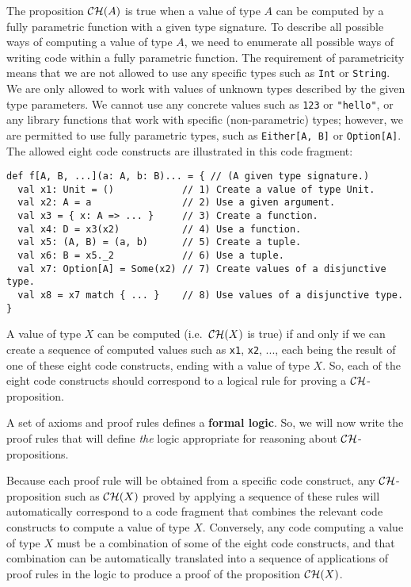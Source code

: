 The proposition ${\cal CH}(A)$ is true when a value of type $A$
can be computed by a fully parametric function with a given type signature.
To describe all possible ways of computing a value of type $A$, we
need to enumerate all possible ways of writing code within a fully
parametric function. The requirement of parametricity means that we
are not allowed to use any specific types such as \lstinline!Int!
or \lstinline!String!. We are only allowed to work with values of
unknown types described by the given type parameters. We cannot use
any concrete values such as \lstinline!123! or \lstinline!"hello"!,
or any library functions that work with specific (non-parametric)
types; however, we are permitted to use fully parametric types, such
as \lstinline!Either[A, B]! or \lstinline!Option[A]!. The allowed
eight code constructs are illustrated in this code fragment:
\begin{lstlisting}
def f[A, B, ...](a: A, b: B)... = { // (A given type signature.)
  val x1: Unit = ()            // 1) Create a value of type Unit.
  val x2: A = a                // 2) Use a given argument.
  val x3 = { x: A => ... }     // 3) Create a function.
  val x4: D = x3(x2)           // 4) Use a function.
  val x5: (A, B) = (a, b)      // 5) Create a tuple.
  val x6: B = x5._2            // 6) Use a tuple.
  val x7: Option[A] = Some(x2) // 7) Create values of a disjunctive type.
  val x8 = x7 match { ... }    // 8) Use values of a disjunctive type.
}
\end{lstlisting}
A value of type $X$ can be computed (i.e.~${\cal CH}(X)$ is true)
if and only if we can create a sequence of computed values such as
\lstinline!x1!, \lstinline!x2!, ..., each being the result of one
of these eight code constructs, ending with a value of type $X$.
So, each of the eight code constructs should correspond to a logical
rule for proving a ${\cal CH}$-proposition.

A set of axioms and proof rules defines a \textbf{formal logic}.
So, we will now write the proof rules that will define \emph{the}
logic appropriate for reasoning about ${\cal CH}$-propositions.

Because each proof rule will be obtained from a specific code construct,
any ${\cal CH}$-proposition such as ${\cal CH}(X)$ proved by applying
a sequence of these rules will automatically correspond to a code
fragment that combines the relevant code constructs to compute a value
of type $X$. Conversely, any code computing a value of type $X$
must be a combination of some of the eight code constructs, and that
combination can be automatically translated into a sequence of applications
of proof rules in the logic to produce a proof of the proposition
${\cal CH}(X)$.

